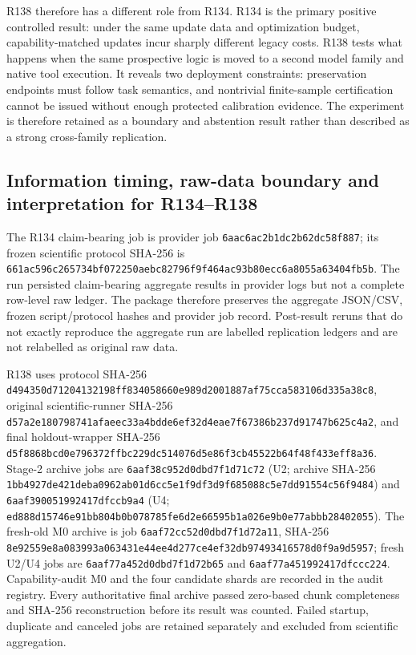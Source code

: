 \documentclass[11pt,letterpaper]{article}
\theoremstyle{plain}
\newcommand{\1}{\mathbf 1}
\begin{document}
R138 therefore has a different role from R134. R134 is the primary positive controlled result: under the same update data and optimization budget, capability-matched updates incur sharply different legacy costs. R138 tests what happens when the same prospective logic is moved to a second model family and native tool execution. It reveals two deployment constraints: preservation endpoints must follow task semantics, and nontrivial finite-sample certification cannot be issued without enough protected calibration evidence. The experiment is therefore retained as a boundary and abstention result rather than described as a strong cross-family replication.

\subsection{Information timing, raw-data boundary and interpretation for R134--R138}
The R134 claim-bearing job is provider job \texttt{6aac6ac2b1dc2b62dc58f887}; its frozen scientific protocol SHA-256 is \texttt{661ac596c265734bf072250aebc82796f9f464ac93b80ecc6a8055a63404fb5b}. The run persisted claim-bearing aggregate results in provider logs but not a complete row-level raw ledger. The package therefore preserves the aggregate JSON/CSV, frozen script/protocol hashes and provider job record. Post-result reruns that do not exactly reproduce the aggregate run are labelled replication ledgers and are not relabelled as original raw data.

R138 uses protocol SHA-256 \nolinkurl{d494350d71204132198ff834058660e989d2001887af75cca583106d335a38c8}, original scientific-runner SHA-256 \nolinkurl{d57a2e180798741afaeec33a4bdde6ef32d4eae7f67386b237d91747b625c4a2}, and final holdout-wrapper SHA-256 \nolinkurl{d5f8868bcd0e796372ffbc229dc514076d5e86f3cb45522b64f48f433eff8a36}. Stage-2 archive jobs are \texttt{6aaf38c952d0dbd7f1d71c72} (U2; archive SHA-256 \nolinkurl{1bb4927de421deba0962ab01d6cc5e1f9df3d9f685088c5e7dd91554c56f9484}) and \texttt{6aaf390051992417dfccb9a4} (U4; \nolinkurl{ed888d15746e91bb804b0b078785fe6d2e66595b1a026e9b0e77abbb28402055}). The fresh-old M0 archive is job \texttt{6aaf72cc52d0dbd7f1d72a11}, SHA-256 \nolinkurl{8e92559e8a083993a063431e44ee4d277ce4ef32db97493416578d0f9a9d5957}; fresh U2/U4 jobs are \texttt{6aaf77a452d0dbd7f1d72b65} and \texttt{6aaf77a451992417dfccc224}. Capability-audit M0 and the four candidate shards are recorded in the audit registry. Every authoritative final archive passed zero-based chunk completeness and SHA-256 reconstruction before its result was counted. Failed startup, duplicate and canceled jobs are retained separately and excluded from scientific aggregation.
\end{document}
